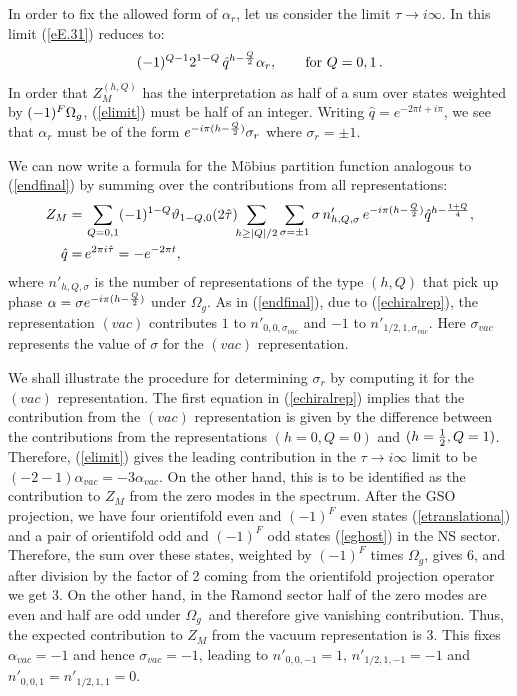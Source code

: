 \documentclass[12pt,a4paper]{article}
\newcommand{\be}{\begin{equation}}
\newcommand{\ee}{\end{equation}}
\newcommand{\refb}[1]{(\ref{#1})}
\newcommand{\vt}{\vartheta}
\def\tn{n'}
\def\ZhQ{Z^{(h,Q)}}
\def\hq{\hat q}
\def\htau{\hat\tau}
\newcommand{\oo}{{$\Omega_g$}}
\begin{document}
In order to fix the allowed form of $\alpha_r$, let us consider the limit $\tau\to i\infty$.
In this limit \refb{eE.31} reduces to:
\be\label{elimit}
(-1)^{Q-1} 2^{1-Q} \,   \hq^{h -{Q\over 2}} \alpha_r, \qquad \hbox{for $Q=0,1$} \, .
\ee
In order that $\ZhQ_{M}$ has the interpretation as half of
a sum over states weighted by $(-1)^F\hbox{\oo}$,
\refb{elimit} must be half of an integer. Writing $\hq = e^{-2\pi t+i\pi}$,
we see that $\alpha_r$ must be of the form $e^{-i\pi (h-{Q\over 2})} \sigma_r$ where $\sigma_r=\pm 1$.


We can now write a formula for the M\"{o}bius partition function
analogous to \refb{endfinal} by summing over the contributions
from all representations:
\be
\begin{split}
Z_{M} =&\,  \sum_{Q=0,1} (-1)^{1-Q} \vt_{1-Q,0}(2\htau)
\!\!\sum_{h\ge |Q|/2} \sum_{\sigma=\pm 1} \sigma\,\tn_{h,Q,\sigma}\,
e^{-i\pi (h-{Q\over 2})} \hq^{h-{1+Q\over 4}},
\\
\hq =&\,  e^{2\pi i\htau}= - e^{-2\pi t} ,
\end{split}
\label{emobfinal}
\ee
where $\tn_{h,Q,\sigma}$ is the number of representations of the type $(h,Q)$ that pick up phase
$\alpha=\sigma e^{-i \pi (h-{Q\over 2})}$ under \oo. As in \refb{endfinal}, due to \refb{echiralrep}, the
representation $(vac)$ contributes $1$ to $\tn_{0,0,\sigma_{vac}}$ and $-1$ to
$\tn_{1/2,1,\sigma_{vac}}$. Here $\sigma_{vac}$ represents the value of $\sigma$ for the $(vac)$ representation.


We shall illustrate the procedure for determining $\sigma_r$ by computing it for the
$(vac)$ representation. The first equation in \refb{echiralrep} implies that the contribution
from the $(vac)$ representation is given by the difference between the contributions from the
representations $(h=0,Q=0)$ and $(h={1\over 2},Q=1)$. Therefore, \refb{elimit} gives the
leading contribution in the $\tau\to i\infty$
limit to be $(-2-1)\alpha_{vac}=-3\alpha_{vac}$. On the other hand,
this is to be identified as the contribution to $Z_{M}$ from the zero modes in the spectrum.
After the GSO projection, we have four orientifold even and $(-1)^F$ even
states \refb{etranslationa} and a pair of orientifold odd and $(-1)^F$ odd
states \refb{eghost} in the NS sector. Therefore, the sum over these states, weighted by
$(-1)^F$ times \oo, gives 6, and after division by the factor of 2 coming from the orientifold projection operator we get 3.
On the other hand, in the Ramond sector half of the zero modes are even and half are odd under \oo\ and therefore give
vanishing contribution. Thus, the expected contribution to $Z_{M}$ from the vacuum
representation is 3. This fixes $\alpha_{vac}=-1$ and hence  $\sigma_{vac}=-1$, leading to
$\tn_{0,0,-1}=1$, $\tn_{1/2,1,-1}=-1$ and $\tn_{0,0,1}=\tn_{1/2,1,1}=0$.
\end{document}
